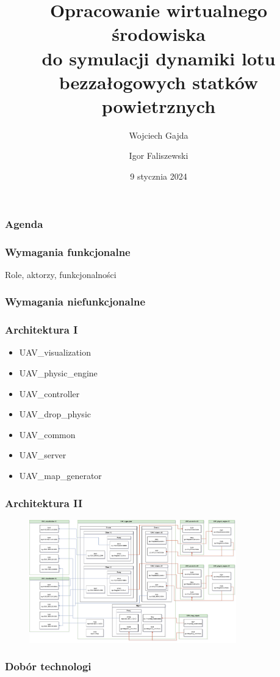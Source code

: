 \documentclass[aspectratio=169]{beamer}
\title{Opracowanie wirtualnego środowiska\\do symulacji dynamiki lotu\\ bezzałogowych statków powietrznych}
\author{Wojciech Gajda \and  Igor Faliszewski}
\date{9 stycznia 2024} %
\begin{document}
\sloppy

{
\maketitleframe 
}

\begin{frame}
\frametitle{Agenda}
  \tableofcontents[  
    sectionstyle=show, 
    ]
\end{frame}

\begin{frame}
	\frametitle{Wymagania funkcjonalne}
	Role, aktorzy, funkcjonalności
\end{frame}

\begin{frame}
	\frametitle{Wymagania niefunkcjonalne}
\end{frame}

\begin{frame}
	\frametitle{Architektura I}
	\begin{itemize}
	\item UAV\_visualization
	\item UAV\_physic\_engine
	\item UAV\_controller
	\item UAV\_drop\_physic
	\item UAV\_common
	\item UAV\_server
	\item UAV\_map\_generator
	\end{itemize}
\end{frame}

\begin{frame}
	\frametitle{Architektura II}
	\begin{figure}
		\centering
		\includegraphics[width=0.8\textwidth]{ZMQinMINIUAV.drawio.png}
	\end{figure}
\end{frame}

\begin{frame}
	\frametitle{Dobór technologi} %
\end{frame}
\end{document}
